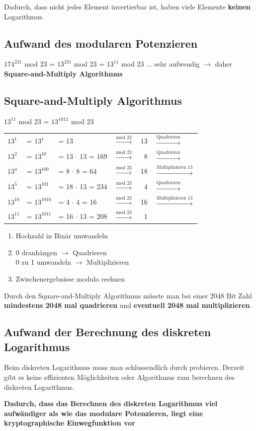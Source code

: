 Dadurch, dass nicht jedes Element invertierbar ist, haben viele Elemente \textbf{keinen} Logarithmus.

\subsection{Aufwand des modularen Potenzieren}
$174^{231}$ mod 23 = $13^{231}$ mod 23 = $13^{11}$ mod 23 ... sehr aufwendig $\rightarrow$ daher \textbf{Square-and-Multiply Algorithmus}

\subsection{Square-and-Multiply Algorithmus}
$13^{11}$ mod 23 = $13^{\texttt{1011}}$ mod 23 \\

\begin{tabular}{llllrl}
	$\text{13}^\text{1}$ & = $\text{13}^{1}$ & = 13 & $\xrightarrow{\text{mod 23}}$ & 13 & $\xrightarrow{\text{Quadrieren}}$ \\
	$\text{13}^\text{2}$ & = $\text{13}^{10}$ & = 13 $\cdot$ 13 = 169 & $\xrightarrow{\text{mod 23}}$ & 8 & $\xrightarrow{\text{Quadrieren}}$ \\
	$\text{13}^\text{4}$ & = $\text{13}^{100}$ & = 8 $\cdot$ 8 = 64 & $\xrightarrow{\text{mod 23}}$ & 18 & $\xrightarrow{\text{Multiplizieren 13}}$ \\
	$\text{13}^\text{5}$ & = $\text{13}^{101}$ & = 18 $\cdot$ 13 = 234 & $\xrightarrow{\text{mod 23}}$ & 4 & $\xrightarrow{\text{Quadrieren}}$ \\
	$\text{13}^\text{10}$ & = $\text{13}^{1010}$ & = 4 $\cdot$ 4 = 16 & $\xrightarrow{\text{mod 23}}$ & 16 & $\xrightarrow{\text{Multiplizieren 13}}$ \\
	$\text{13}^\text{11}$ & = $\text{13}^{1011}$ & = 16 $\cdot$ 13 = 208 & $\xrightarrow{\text{mod 23}}$ & 1 &  \\
\end{tabular}
\begin{enumerate}
	\item Hochzahl in Binär umwandeln
	\item 0 dranhängen $\rightarrow$ Quadrieren \\
	0 zu 1 umwandeln $\rightarrow$ Multiplizieren
	\item Zwischenergebnisse modulo rechnen
\end{enumerate}

Durch den Square-and-Multiply Algorithmus müsste man bei einer 2048 Bit Zahl \textbf{mindestens 2048 mal quadrieren} und \textbf{eventuell 2048 mal multiplizieren}.

\subsection{Aufwand der Berechnung des diskreten Logarithmus}
Beim diskreten Logarithmus muss man schlussendlich durch probieren. Derzeit gibt es keine effizienten Möglichkeiten oder Algorithmus zum berechnen des diskreten Logarithmus.

\textbf{Dadurch, dass das Berechnen des diskreten Logarithmus viel aufwändiger als wie das modulare Potenzieren, liegt eine kryptographische Einwegfunktion vor}